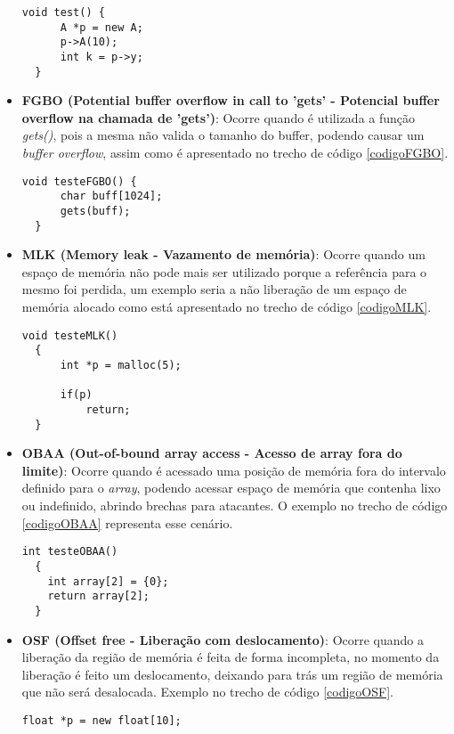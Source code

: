 \begin{itemize}
\begin{lstlisting}[caption={Código exemplo DUPV}, label=codigoDUPV]
  void test() {
      A *p = new A;
      p->A(10);
      int k = p->y;
  } 
    \end{lstlisting}
  \item \textbf{FGBO (Potential buffer overflow in call to 'gets' - Potencial buffer overflow na chamada de 'gets')}: Ocorre
    quando é utilizada a função \textit{gets()}, pois a mesma não valida o tamanho do buffer, podendo causar um \textit{buffer
    overflow}, assim como é apresentado no trecho de código \ref{codigoFGBO}.

    \begin{lstlisting}[caption={Código exemplo FGBO}, label=codigoFGBO]
  void testeFGBO() {
      char buff[1024];
      gets(buff);
  } 
    \end{lstlisting}
  \item \textbf{MLK (Memory leak - Vazamento de memória)}: Ocorre quando um espaço de memória não pode mais ser utilizado
    porque a referência para o mesmo foi perdida, um exemplo seria a não liberação de um espaço de memória alocado como está
    apresentado no trecho de código \ref{codigoMLK}.

    \begin{lstlisting}[caption={Código exemplo MLK}, label=codigoMLK]
  void testeMLK()
  {
      int *p = malloc(5);

      if(p) 
          return;
  }
    \end{lstlisting}
  \item \textbf{OBAA (Out-of-bound array access - Acesso de array fora do limite)}: Ocorre quando é acessado uma posição de
    memória fora do intervalo definido para o \textit{array}, podendo acessar espaço de memória que contenha lixo ou 
    indefinido, abrindo brechas para atacantes. O exemplo no trecho de código \ref{codigoOBAA} representa esse cenário.

    \begin{lstlisting}[caption={Código exemplo OBAA}, label=codigoOBAA]
  int testeOBAA()
  {
    int array[2] = {0};
    return array[2];
  }
    \end{lstlisting}
  \item \textbf{OSF (Offset free - Liberação com deslocamento)}: Ocorre quando a liberação da região de memória é feita de 
    forma incompleta, no momento da liberação é feito um deslocamento, deixando para trás um região de memória que não será
    desalocada. Exemplo no trecho de código \ref{codigoOSF}.

    \begin{lstlisting}[caption={Código exemplo OSF}, label=codigoOSF]
  float *p = new float[10];


\end{lstlisting}
\end{itemize}
